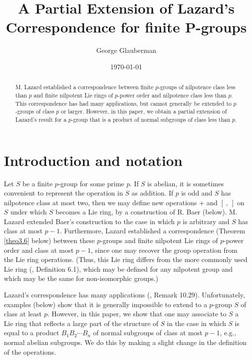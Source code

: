 \documentclass[mathscr]{amsart}
\theoremstyle{theorem}
\theoremstyle{definition}
\numberwithin{equation}{section}
\begin{document}
\title{A Partial Extension of Lazard's Correspondence for finite P-groups}
\author{George Glauberman}
\date{\today}

\maketitle

\begin{abstract}
M. Lazard established a correspondence between finite $p$-groups of
nilpotence class less than $p$ and finite nilpotent Lie rings of
$p$-power order and nilpotence class less than $p$. This
correspondence has had many applications, but cannot generally be
extended to $p$-groups of class $p$ or larger. However, in this
paper, we obtain a partial extension of Lazard's result for a
$p$-group that is a product of normal subgroups of class less than
$p.$

\end{abstract}

\section{Introduction and notation}\label{sec1}
Let $S$ be a finite $p$-group for some prime $p.$ If $S$ is abelian,
it is sometimes convenient to represent the operation in $S$ as
addition. If $p$ is odd and $S$ has nilpotence class at most two,
then we may define new operations + and $[\ ,\ ]$ on $S$ under which
$S$ becomes a Lie ring, by a construction of R. Baer (below). M.
Lazard extended Baer's construction to the case in which $p$ is
arbitrary and $S$ has class at most $p-1$. Furthermore, Lazard
established a correspondence (Theorem \ref{theo3.6} below) between
these $p$-groups and finite nilpotent Lie rings of $p$-power order
and class at most $p-1$, since one may recover the group operation
from the Lie ring operations. (Thus, this Lie ring differs from the
more commonly used Lie ring (\cite{Kh}, Definition 6.1), which may
be defined for any nilpotent group and which may be the same for
non-isomorphic groups.)

Lazard's correspondence has many applications (\cite{Kh}, Remark
10.29). Unfortunately, examples (below) show that it is generally
impossible to extend to a $p$-group $S$ of class at least $p$.
However, in this paper, we show that one may associate to $S$ a Lie
ring that reflects a large part of the structure  of $S$ in the case
in which $S$ is equal to a product $B_1B_2\cdots B_n$ of normal
subgroups of class at most $p-1$, e.g., normal  abelian subgroups.
We do this by making a slight change in the definition of the
operations.
\end{document}
